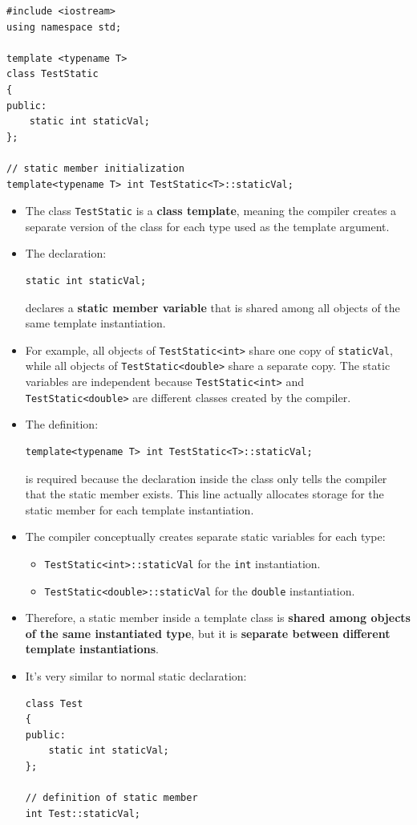 \documentclass[10pt]{article}
\newcommand{\pbreak}{\vspace{30pt}}
\begin{document}
\newpage

\begin{verbatim}
#include <iostream>
using namespace std;

template <typename T>
class TestStatic 
{
public:
	static int staticVal;
};

// static member initialization
template<typename T> int TestStatic<T>::staticVal;
\end{verbatim}

\begin{itemize}
    \item The class \verb|TestStatic| is a \textbf{class template}, meaning the compiler creates a separate version of the class for each type used as the template argument.

    \item The declaration:
\begin{verbatim}
static int staticVal;
\end{verbatim}
    declares a \textbf{static member variable} that is shared among all objects of the same template instantiation.

    \item For example, all objects of \verb|TestStatic<int>| share one copy of \verb|staticVal|, while all objects of \verb|TestStatic<double>| share a separate copy. The static variables are independent because \verb|TestStatic<int>| and \verb|TestStatic<double>| are different classes created by the compiler.

    \item The definition:
\begin{verbatim}
template<typename T> int TestStatic<T>::staticVal;
\end{verbatim}
    is required because the declaration inside the class only tells the compiler that the static member exists. This line actually allocates storage for the static member for each template instantiation.

    \item The compiler conceptually creates separate static variables for each type:
    \begin{itemize}
        \item \verb|TestStatic<int>::staticVal| for the \verb|int| instantiation.
        \item \verb|TestStatic<double>::staticVal| for the \verb|double| instantiation.
    \end{itemize}

    \item Therefore, a static member inside a template class is \textbf{shared among objects of the same instantiated type}, but it is \textbf{separate between different template instantiations}.

		\pbreak

	\item It's very similar to normal static declaration:
		\begin{verbatim}
class Test
{
public:
    static int staticVal;
};

// definition of static member
int Test::staticVal;
		\end{verbatim}
\end{itemize}
\end{document}

